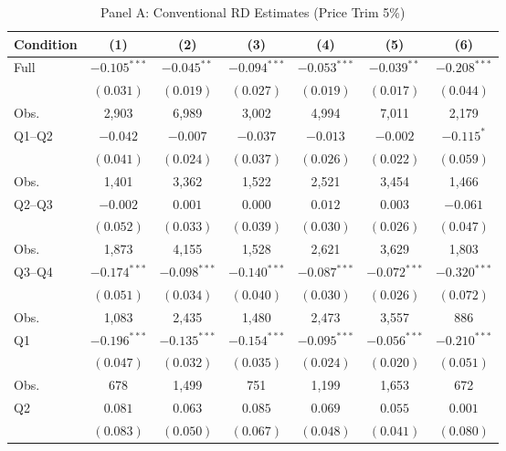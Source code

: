 
\begin{table}[!htbp]
\centering
\caption{Panel A: Conventional RD Estimates (Price Trim 5\%)}
\label{tab:panel_a_price5_conventional}
\begin{tabular}{lcccccc}
\hline\hline
Condition & (1) & (2) & (3) & (4) & (5) & (6) \\
\hline
Full  & $-0.105^{***}$ & $-0.045^{**}$ & $-0.094^{***}$ & $-0.053^{***}$ & $-0.039^{**}$ & $-0.208^{***}$ \\
      & $(0.031)$ & $(0.019)$ & $(0.027)$ & $(0.019)$ & $(0.017)$ & $(0.044)$ \\
Obs.  & 2,903 & 6,989 & 3,002 & 4,994 & 7,011 & 2,179 \\
\addlinespace[2pt]
Q1--Q2 & $-0.042$ & $-0.007$ & $-0.037$ & $-0.013$ & $-0.002$ & $-0.115^{*}$ \\
       & $(0.041)$ & $(0.024)$ & $(0.037)$ & $(0.026)$ & $(0.022)$ & $(0.059)$ \\
Obs.   & 1,401 & 3,362 & 1,522 & 2,521 & 3,454 & 1,466 \\
\addlinespace[2pt]
Q2--Q3 & $-0.002$ & $0.001$ & $0.000$ & $0.012$ & $0.003$ & $-0.061$ \\
       & $(0.052)$ & $(0.033)$ & $(0.039)$ & $(0.030)$ & $(0.026)$ & $(0.047)$ \\
Obs.   & 1,873 & 4,155 & 1,528 & 2,621 & 3,629 & 1,803 \\
\addlinespace[2pt]
Q3--Q4 & $-0.174^{***}$ & $-0.098^{***}$ & $-0.140^{***}$ & $-0.087^{***}$ & $-0.072^{***}$ & $-0.320^{***}$ \\
       & $(0.051)$ & $(0.034)$ & $(0.040)$ & $(0.030)$ & $(0.026)$ & $(0.072)$ \\
Obs.   & 1,083 & 2,435 & 1,480 & 2,473 & 3,557 & 886 \\
\addlinespace[2pt]
Q1     & $-0.196^{***}$ & $-0.135^{***}$ & $-0.154^{***}$ & $-0.095^{***}$ & $-0.056^{***}$ & $-0.210^{***}$ \\
       & $(0.047)$ & $(0.032)$ & $(0.035)$ & $(0.024)$ & $(0.020)$ & $(0.051)$ \\
Obs.   & 678 & 1,499 & 751 & 1,199 & 1,653 & 672 \\
\addlinespace[2pt]
Q2     & $0.081$ & $0.063$ & $0.085$ & $0.069$ & $0.055$ & $0.001$ \\
       & $(0.083)$ & $(0.050)$ & $(0.067)$ & $(0.048)$ & $(0.041)$ & $(0.080)$ \\

\end{tabular}
\end{table}
